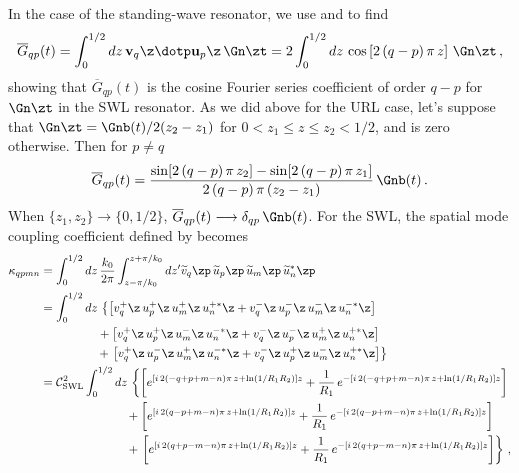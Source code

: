 In the case of the standing-wave resonator, we use  and  to find
\begin{equation} %
  \overline{G}_{q p}(t) = \int_0^{1/2} d z\, \mathbf{v}_q\z \dotp \mathbf{u}_p\z\, \Gn\zt = 2 \int_0^{1/2} d z\, \cos\left[ 2\, (q - p)\, \pi\, z \right]\, \Gn\zt\, , 
\end{equation}
showing that $\overline{G}_{q p}(t)$ is the cosine Fourier series coefficient of order $q - p$ for $\Gn\zt$ in the SWL resonator. As we did above for the URL case, let's suppose that $\Gn\zt = \Gnb(t)/2 (z_2 - z_1)$ for $0 < z_1 \le z \le z_2 < 1/2$, and is zero otherwise. Then for $p \ne q$
 \begin{equation} %
\overline{G}_{q p}(t) = \frac{\sin[2\, (q - p)\, \pi\, z_2] - \sin[2\, (q - p)\, \pi\, z_1]}{2\, (q - p)\, \pi\, (z_2 - z_1)}\, \Gnb(t)\, .
  \end{equation}
When $\{z_1, z_2\} \longrightarrow \{0, 1/2\}$, $\overline{G}_{q p}(t) \longrightarrow \delta_{q p}\, \Gnb(t)$.
For the SWL, the spatial mode coupling coefficient defined by  becomes
\begin{equation*}
  \begin{split}
    \kappa_{q p m n} &= \int_0^{1/2} d z\, \frac{k_0}{2 \pi} \int_{z - \pi/k_0}^{z + \pi/k_0} d z^\prime \widetilde{v}_q\zp\, \widetilde{u}_p\zp\, \widetilde{u}_m\zp\, \widetilde{u}_n^\ast\zp \\
    &= \int_0^{1/2} d z\,
      \left\{ \left[ v_q^+\z\, u_p^+\z\, u_m^+\z\, u_n^{+\ast}\z + v_q^-\z\, u_p^-\z\, u_m^-\z\, u_n^{-\ast}\z \right]\right. \\
      &\quad\quad\quad\quad\;\;\: + \left[ v_q^+\z\, u_p^+\z\, u_m^-\z\, u_n^{-\ast}\z + v_q^-\z\, u_p^-\z\, u_m^+\z\, u_n^{+\ast}\z \right] \\
      &\quad\quad\quad\quad\;\;\, + \left. \left[ v_q^+\z\, u_p^-\z\, u_m^+\z\, u_n^{-\ast}\z + v_q^-\z\, u_p^+\z\, u_m^-\z\, u_n^{+\ast}\z \right] \right\}\\
    &= \mathcal{C}^2_\mathrm{SWL} \int_0^{1/2} d z\,
      \left\{ \left[ e^{\left[i\, 2 (-q + p + m - n) \pi\, z + \ln(1/R_1 R_2)\right] z} +  \frac{1}{R_1}\, e^{-\left[i\, 2 (-q + p + m - n) \pi\, z + \ln(1/R_1 R_2)\right] z} \right]\right. \\
      &\quad\quad\quad\quad\quad\quad\quad\, + \left[ e^{\left[i\, 2 (q - p + m - n) \pi\, z + \ln(1/R_1 R_2)\right] z} +  \frac{1}{R_1}\, e^{-\left[i\, 2 (q - p + m - n) \pi\, z + \ln(1/R_1 R_2)\right] z} \right] \\
      &\quad\quad\quad\quad\quad\quad\quad\, + \left. \left[ e^{\left[i\, 2 (q + p - m - n) \pi\, z + \ln(1/R_1 R_2)\right] z} +  \frac{1}{R_1}\, e^{-\left[i\, 2 (q + p - m - n) \pi\, z + \ln(1/R_1 R_2)\right] z} \right] \right\}\, ,
  \end{split}
\end{equation*}

